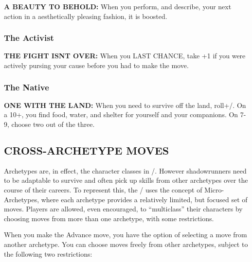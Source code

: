 \documentclass[oneside,10pt]{article}
\begin{document}
\begin{multicols}{2}
\textbf{A BEAUTY TO BEHOLD:} When you perform, and describe, your next action in a
aesthetically pleasing fashion, it is boosted.


\subsubsection{The Activist}

\textbf{THE FIGHT ISNT OVER:} When you LAST CHANCE, take +1 if you were actively
pursing your cause before you had to make the move.

\subsubsection{The Native}

\textbf{ONE WITH THE LAND:} When you need to survive off the land,
roll+\mastery/. On a 10+, you find food, water, and shelter for
yourself and your companions. On 7-9, choose two out of the three.

\subsection{CROSS-ARCHETYPE MOVES}
\label{crossarchetypemoves}
Archetypes are, in effect, the character classes in \SW/.
However shadowrunners need to be adaptable to survive and often pick
up skills from other archetypes over the course of their careers. To
represent this, the \SW/ uses the concept of Micro-Archetypes, where
each archetype provides a relatively limited, but focused set of
moves. Players are allowed, even encouraged, to ``multiclass'' their
characters by choosing moves from more than one archetype, with some restrictions.

When you make the Advance move, you have the option of
selecting a move from another archetype. You can choose
moves freely from other archetypes, subject to the following
two restrictions:
\begin{dent}


\end{dent}
\end{multicols}
\end{document}
